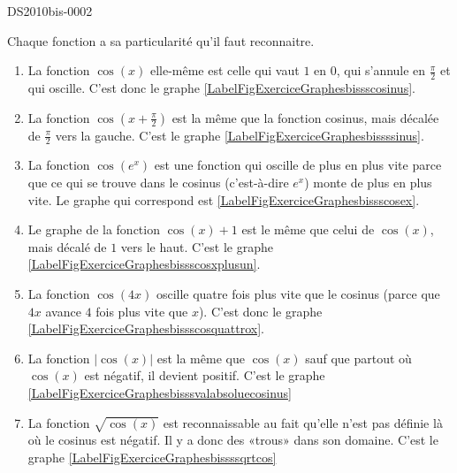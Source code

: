 
\begin{corrige}{DS2010bis-0002}

	Chaque fonction a sa particularité qu'il faut reconnaitre.
	\begin{enumerate}
		\item
			La fonction $\cos(x)$ elle-même est celle qui vaut $1$ en $0$, qui s'annule en $\frac{ \pi }{2}$ et qui oscille. C'est donc le graphe \ref{LabelFigExerciceGraphesbissscosinus}.
		\item
			La fonction $\cos(x+\frac{ \pi }{2})$ est la même que la fonction cosinus, mais décalée de $\frac{ \pi }{2}$ vers la gauche. C'est le graphe  \ref{LabelFigExerciceGraphesbissssinus}.
		\item
			La fonction $\cos( e^{x})$ est une fonction qui oscille de plus en plus vite parce que ce qui se trouve dans le cosinus (c'est-à-dire  $ e^{x}$) monte de plus en plus vite. Le graphe qui correspond est \ref{LabelFigExerciceGraphesbissscosex}.
		\item
			Le graphe de la fonction $\cos(x)+1$ est le même que celui de $\cos(x)$, mais décalé de $1$ vers le haut. C'est le graphe \ref{LabelFigExerciceGraphesbissscosxplusun}.
		\item
			La fonction $\cos(4x)$ oscille quatre fois plus vite que le cosinus (parce que $4x$ avance $4$ fois plus vite que $x$). C'est donc le graphe \ref{LabelFigExerciceGraphesbissscosquattrox}.
		\item
			La fonction $| \cos(x) |$ est la même que $\cos(x)$ sauf que partout où $\cos(x)$ est négatif, il devient positif. C'est le graphe \ref{LabelFigExerciceGraphesbisssvalabsoluecosinus}
		\item
			La fonction $\sqrt{\cos(x)}$ est reconnaissable au fait qu'elle n'est pas définie là où le cosinus est négatif. Il y a donc des «trous» dans son domaine. C'est le graphe \ref{LabelFigExerciceGraphesbissssqrtcos}
	\end{enumerate}
	
\end{corrige}
